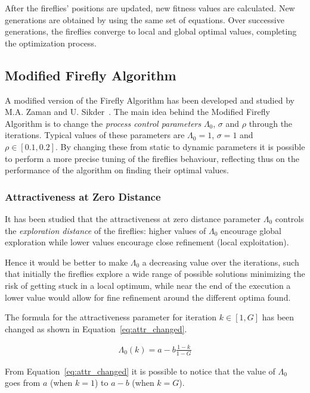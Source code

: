 After the fireflies' positions are updated, new fitness values
are calculated. New generations are obtained
by using the same set of equations. Over successive generations,
the fireflies converge to local and global optimal values,
completing the optimization process.


\subsection{Modified Firefly Algorithm}
\label{sec:5.mfa}

A modified version of the Firefly Algorithm has been developed and studied
by M.A. Zaman and U. Sikder~\cite{zaman2015bouc}. The main idea behind
the Modified Firefly Algorithm is to change the \textit{process control parameters}
$\Lambda_0$, $\sigma$ and $\rho$ through the iterations. Typical values
of these parameters are $\Lambda_0=1$, $\sigma = 1$ and $\rho \in \left[0.1,0.2\right]$.
By changing these from static to dynamic parameters it is possible to perform
a more precise tuning of the fireflies behaviour, reflecting thus on the performance
of the algorithm on finding their optimal values.

\subsubsection{Attractiveness at Zero Distance}
\label{sec:5.azd}

It has been studied that the attractiveness at zero distance parameter $\Lambda_0$
controls the \textit{exploration distance} of the fireflies: 
higher values of $\Lambda_0$ encourage global exploration while
lower values encourage close refinement (local exploitation). 

Hence it would be better to make $\Lambda_0$ a decreasing value over the iterations, 
such that initially the fireflies explore a wide range of possible solutions
minimizing the risk of getting stuck in a local optimum, while 
near the end of the execution a lower value would allow for fine refinement
around the different optima found.

The formula for the attractiveness parameter for iteration
$k\in \left[1,G\right]$ has been changed as shown in Equation~\ref{eq:attr_changed}.

\begin{align}
\label{eq:attr_changed}
\Lambda_0(k) = a - b\frac{1-k}{1-G}
\end{align}

From Equation~\ref{eq:attr_changed} it is possible to notice
that the value of $\Lambda_0$ goes from $a$ (when $k=1$) to $a-b$ (when $k=G$).

